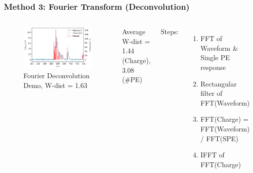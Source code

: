 \documentclass{beamer}
\begin{document}
\begin{frame}
\frametitle{Method 3: Fourier Transform (Deconvolution)}
\begin{columns}
\begin{figure}
    \centering
    \caption{Fourier Deconvolution Demo, W-dist = 1.63}
    \includegraphics[width=1.0\linewidth]{img/fftrans.png}
\end{figure}
\vspace{-4mm}
\begin{center}
    Average W-dist = 1.44 (Charge), 3.08 (\#PE)
\end{center}
Steps:
\begin{enumerate}
    \item FFT of Waveform \& Single PE response
    \item Rectangular filter of FFT(Waveform)
    \item FFT(Charge) = FFT(Waveform) / FFT(SPE)
    \item IFFT of FFT(Charge)
\end{enumerate}
\end{columns}
\end{frame}
\end{document}
